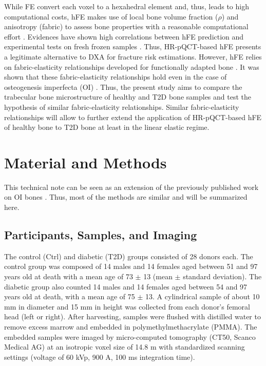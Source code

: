 \documentclass[a4paper,fleqn]{DC_ArtStyle}
\begin{document}
	While \textmu FE convert each voxel to a hexahedral element and, thus, leads to high computational costs, hFE makes use of local bone volume fraction ($\rho$) and anisotropy (fabric) to assess bone properties with a reasonable computational effort \cite{Pahr2009}.
	Evidences have shown high correlations between hFE prediction and experimental tests on fresh frozen samples \cite{Varga2011, Hosseini2017, AriasMoreno2019, Schenk2022, Simon2024}.
	Thus, HR-pQCT-based hFE presents a legitimate alternative to DXA for fracture risk estimations.
	However, hFE relies on fabric-elasticity relationships developed for functionally adapted bone \cite{Zysset1998}.
	It was shown that these fabric-elasticity relationships hold even in the case of osteogenesis imperfecta (OI) \cite{Simon2022}.
	Thus, the present study aims to compare the trabecular bone microstructure of healthy and T2D bone samples and test the hypothesis of similar fabric-elasticity relationships.
	Similar fabric-elasticity relationships will allow to further extend the application of HR-pQCT-based hFE of healthy bone to T2D bone at least in the linear elastic regime.

	
	\section{Material and Methods}
	This technical note can be seen as an extension of the previously published work on OI bones \cite{Simon2022}.
	Thus, most of the methods are similar and will be summarized here.
	
	\subsection{Participants, Samples, and Imaging}
	The control (Ctrl) and diabetic (T2D) groups consisted of 28 donors each.
	The control group was composed of 14 males and 14 females aged between 51 and 97 years old at death with a mean age of 73 $\pm$ 13 (mean $\pm$ standard deviation).
	The diabetic group also counted 14 males and 14 females aged between 54 and 97 years old at death, with a mean age of 75 $\pm$ 13.
	A cylindrical sample of about 10 mm in diameter and 15 mm in height was collected from each donor's femoral head (left or right).
	After harvesting, samples were flushed with distilled water to remove excess marrow and embedded in polymethylmethacrylate (PMMA).
	The embedded samples were imaged by micro-computed tomography (\textmu CT50, Scanco Medical AG) at an isotropic voxel size of 14.8 \textmu m with standardized scanning settings (voltage of 60 kVp, 900 \textmu A, 100 ms integration time).
   
\end{document}
